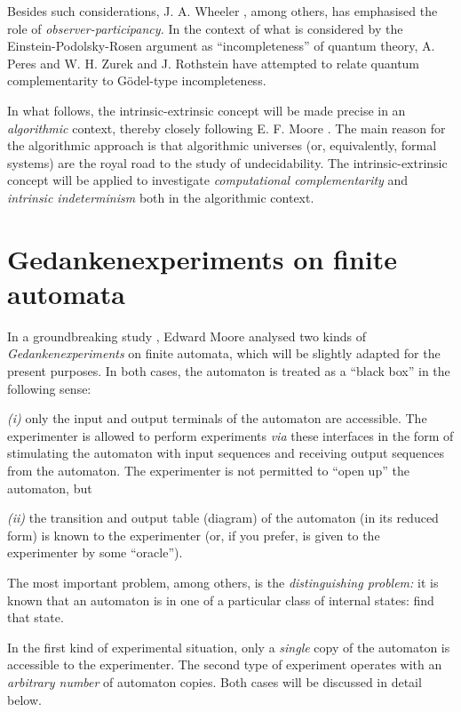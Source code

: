 \documentclass{article}
\begin{document}
 Besides such considerations, J. A. Wheeler \cite{wheeler}, among
 others, has emphasised
 the role of {\em observer-participancy.} In the context of what is
 considered by the Einstein-Podolsky-Rosen argument \cite{epr} as
 ``incompleteness'' of quantum theory, A. Peres and W. H. Zurek
 \cite{peres,peres-85} and J. Rothstein \cite{rothstein} have attempted
 to relate quantum complementarity to G\"odel-type incompleteness.


 In what follows, the intrinsic-extrinsic concept
 will be made precise in an {\em algorithmic} context, thereby
 closely following
 E. F. Moore
 \cite{moore}.
 The main reason for the algorithmic approach is
 that algorithmic universes (or, equivalently,
 formal systems)
 are the royal road to
 the study of undecidability.
 The intrinsic-extrinsic concept will be applied to investigate
 {\em computational
 complementarity}
and {\em intrinsic indeterminism}
 both in the
 algorithmic context.



 \section{Gedankenexperiments on finite automata}
 In a groundbreaking study \cite{moore},
 Edward Moore analysed two kinds
 of {\it Gedankenexperiments} on finite automata,
 which will be slightly adapted for the present purposes.
 In both
 cases, the automaton is treated as a ``black box'' in the following
 sense:

 {\it (i)} only
 the input and output terminals of the automaton are accessible.
 The experimenter is allowed to perform experiments {\it via} these
interfaces in the form of stimulating the automaton with input
sequences and receiving output sequences from the automaton.
 The experimenter is not permitted to ``open up'' the automaton,
 but

 {\it (ii)} the transition and output table (diagram) of the automaton
 (in its reduced form) is known to the experimenter
 (or, if you prefer, is given to the experimenter by some ``oracle'').

 The most important problem, among others, is the {\em distinguishing
 problem:} it is known that an automaton
 is in one of a particular class of internal states: find that state.


 In the first kind of experimental situation, only a {\em single} copy
 of the automaton is accessible to the experimenter. The second type of
 experiment operates with an {\em arbitrary number} of automaton
 copies. Both cases will be discussed in detail below.
\end{document}
